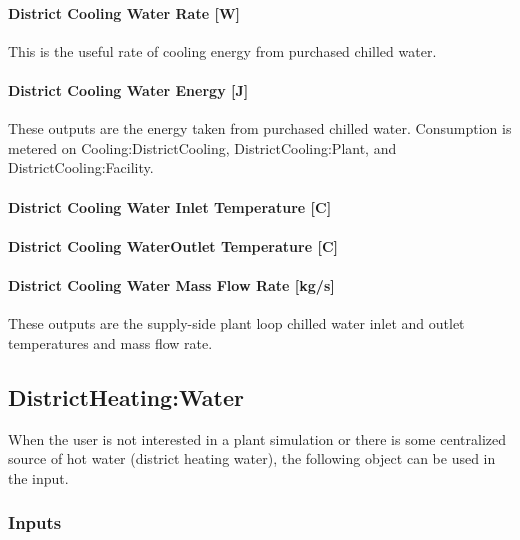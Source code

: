 \paragraph{District Cooling Water Rate {[}W{]}}\label{district-cooling-chilled-water-rate-w}

This is the useful rate of cooling energy from purchased chilled water.

\paragraph{District Cooling Water Energy {[}J{]}}\label{district-cooling-chilled-water-energy-j}

These outputs are the energy taken from purchased chilled water. Consumption is metered on Cooling:DistrictCooling, DistrictCooling:Plant, and DistrictCooling:Facility.

\paragraph{District Cooling Water Inlet Temperature {[}C{]}}\label{district-cooling-inlet-temperature-c}

\paragraph{District Cooling WaterOutlet Temperature {[}C{]}}\label{district-cooling-outlet-temperature-c}

\paragraph{District Cooling Water Mass Flow Rate {[}kg/s{]}}\label{district-cooling-mass-flow-rate-kgs}

These outputs are the supply-side plant loop chilled water inlet and outlet temperatures and mass flow rate.

\subsection{DistrictHeating:Water}\label{districtheating}

When the user is not interested in a plant simulation or there is some centralized source of hot water (district heating water), the following object can be used in the input.

\subsubsection{Inputs}\label{inputs-17-006}

